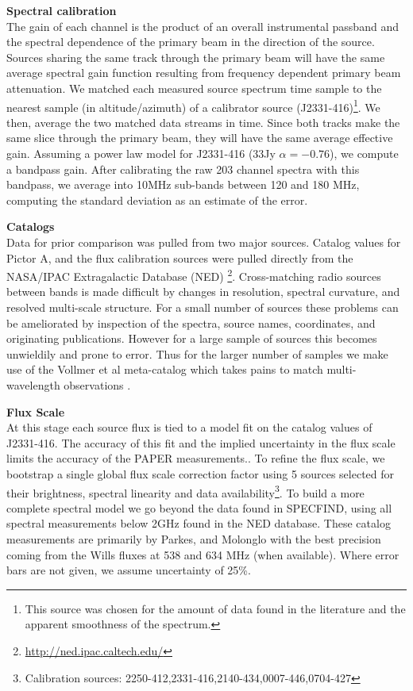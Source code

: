 \documentclass[preprint]{aastex}
\begin{document}
\textbf{Spectral calibration}\\
\label{sec:Calibration}
The gain of each channel is the product of an overall instrumental passband and the spectral dependence of the primary beam in the direction of the source.  Sources sharing the same track through the primary beam will have the same average spectral gain function resulting from frequency dependent primary beam attenuation.   We matched each measured source spectrum time sample to the nearest sample (in altitude/azimuth) of a calibrator source (J2331-416)\footnote{This source was chosen for the amount of data found in the literature and the apparent smoothness of the spectrum.}.  We then, average the two matched data streams in time.  Since both tracks make the same slice through the primary beam, they will have the same average effective gain. Assuming a power law model for J2331-416 (33Jy $\alpha=-0.76$), we compute a bandpass gain.  After calibrating the raw 203 channel spectra with this bandpass, we average into 10MHz sub-bands between 120 and 180 MHz, computing the standard deviation as an estimate of the error. 

\textbf{Catalogs}\\
Data for prior comparison was pulled from two major sources. Catalog values for Pictor A, and the flux calibration sources were pulled directly from the NASA/IPAC Extragalactic Database (NED) \footnote{\url{http://ned.ipac.caltech.edu/}}. Cross-matching radio sources between bands is made difficult by changes in resolution, spectral curvature, and resolved multi-scale structure.  For a small number of sources these problems can be ameliorated by inspection of the spectra, source names, coordinates,  and originating publications. However for a large sample of sources this becomes unwieldily and prone to error. Thus for the larger number of samples we make use of the Vollmer et al meta-catalog which takes pains to match multi-wavelength observations \citep{Vollmer:2010p6422}.%


\textbf{Flux Scale}\\
\label{sec:flux_scale}
At this stage each source flux is tied to a model fit on the catalog values of J2331-416. The accuracy of this fit and the implied uncertainty in the flux scale limits the accuracy of the PAPER measurements..  To refine the flux scale, we bootstrap a single global flux scale correction factor using 5 sources selected for their brightness, spectral linearity and data availability\footnote{Calibration sources: 2250-412,2331-416,2140-434,0007-446,0704-427}. To build a more complete spectral model we go beyond the data found in SPECFIND, using all spectral measurements below 2GHz found in the NED database.  These catalog measurements are primarily by Parkes, and Molonglo with the best precision coming from the Wills fluxes at 538 and 634 MHz (when available). Where error bars are not given, we assume uncertainty of 25\%. 
\end{document}
